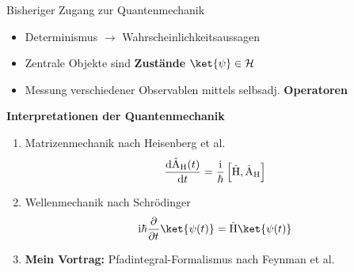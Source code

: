 \begin{frame}{Bisheriger Zugang zur Quantenmechanik}
\begin{itemize}
	\item Determinismus $\longrightarrow $ Wahrscheinlichkeitsaussagen
	\item Zentrale Objekte sind \textbf{Zustände} $\ket{\psi} \in \mathcal{H}$
	\item Messung verschiedener Observablen mittels selbsadj. \textbf{Operatoren}
\end{itemize}
\begin{center}
	\textbf{Interpretationen der Quantenmechanik}
\end{center}
\begin{enumerate}
	\item Matrizenmechanik  nach Heisenberg et al.
	\begin{align*}
	\frac{\mathrm{d}\hat{\text{A}}_{{\rm H}}(t)}{\mathrm{d}t}=\frac{\mathrm{i}}{\hbar}\left[\hat{\text{H}},\hat{\text{A}}_{\rm H}\right]
	\end{align*}
	\item Wellenmechanik nach Schrödinger
	\begin{align*}
		\mathrm{i}\hbar \frac{\partial}{\partial t} \ket{\psi(t)} = \hat{\text{H}} \ket{\psi(t)}
	\end{align*}
	\item \textbf{Mein Vortrag:} Pfadintegral-Formalismus nach Feynman et al. 
\end{enumerate}
\end{frame}

